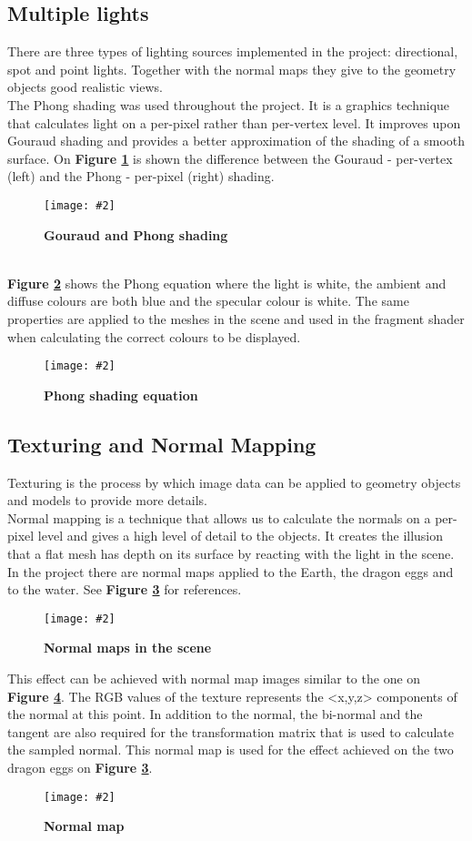 \documentclass[10pt, a4paper]{article}
\newcommand{\figuremacro}[5]{
    \begin{figure}[#1]
        \centering
        \texttt{[image: \#2]}
        \caption[#3]{\textbf{#3}#4}
        \label{fig:#2}
    \end{figure}
}
\begin{document}
	\subsection{Multiple lights}
	There are three types of lighting sources implemented in the project: directional, spot and point lights. Together with the normal maps they give to the geometry objects good realistic views. 
	\\The Phong shading was used throughout the project. It is a graphics technique that calculates light on a per-pixel rather than per-vertex level. It improves upon Gouraud shading and provides a better approximation of the shading of a smooth surface. On \textbf{Figure {\ref{fig:phongAndGouraud}}} is shown the difference between the Gouraud - per-vertex (left) and the Phong - per-pixel (right) shading.
	\figuremacro{h}{phongAndGouraud}{Gouraud and Phong shading}{ }{0.9}	
	\\\textbf{Figure {\ref{fig:phongEquation}}} shows the Phong equation where the light is white, the ambient and diffuse colours are both blue and the specular colour is white. The same properties are applied to the meshes in the scene and used in the fragment shader when calculating the correct colours to be displayed.
	\figuremacro{h}{phongEquation}{Phong shading equation}{ }{1.0}		
	
	\subsection{Texturing and Normal Mapping}
	Texturing is the process by which image data can be applied to geometry objects and models to provide more details. 
    \\Normal mapping is a technique that allows us to calculate the normals on a per-pixel level and gives a high level of detail to the objects. It creates the illusion that a flat mesh has depth on its surface by reacting with the light in the scene. In the project there are normal maps applied to the Earth, the dragon eggs and to the water. See \textbf{Figure {\ref{fig:normalMaps}}} for references.
   	\figuremacro{h}{normalMaps}{Normal maps in the scene}{ }{1.0}	
   	
   	This effect can be achieved with normal map images similar to the one on \textbf{Figure {\ref{fig:bublenormalmap}}}. The RGB values of the texture represents the <x,y,z> components of the normal at this point. In addition to the normal, the bi-normal and the tangent are also required for the transformation matrix that is used to calculate the sampled normal. This normal map is used for the effect achieved on the two dragon eggs on \textbf{Figure {\ref{fig:normalMaps}}}.
	\figuremacro{h}{bublenormalmap}{Normal map}{ }{0.52}	
	   	
\end{document}
